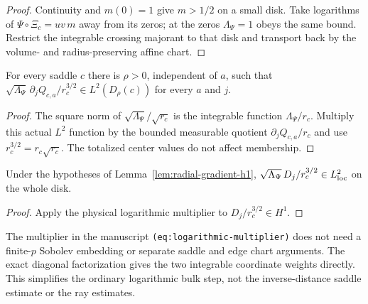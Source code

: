 \begin{proof}
\leanok
Continuity and $m(0)=1$ give $m>1/2$ on a small disk.
Take logarithms of $\Psi\circ\Xi_c=uv\,m$ away from its zeros; at the
zeros $\Lambda_\Psi=1$ obeys the same bound.
Restrict the integrable crossing majorant to that disk and transport
back by the volume- and radius-preserving affine chart.
\end{proof}

\begin{lemma}
\label{lem:saddle-quadratic-log-gradient}
\leanok
For every saddle $c$ there is $\rho>0$, independent of $a$, such that
$\sqrt{\Lambda_\Psi}\,\partial_jQ_{c,a}/r_c^{3/2}\in L^2(D_\rho(c))$
for every $a$ and $j$.
\end{lemma}

\begin{proof}
\leanok
The square norm of $\sqrt{\Lambda_\Psi}/\sqrt{r_c}$ is the integrable
function $\Lambda_\Psi/r_c$.
Multiply this actual $L^2$ function by the bounded measurable quotient
$\partial_jQ_{c,a}/r_c$ and use $r_c^{3/2}=r_c\sqrt{r_c}$.
The totalized center values do not affect membership.
\end{proof}

\begin{lemma}
\label{lem:log-radial-gradient}
\leanok
Under the hypotheses of Lemma~\ref{lem:radial-gradient-h1},
$\sqrt{\Lambda_\Psi}\,D_j/r_c^{3/2}\in L^2_{\rm loc}$ on the whole disk.
\end{lemma}

\begin{proof}
\leanok
Apply the physical logarithmic multiplier to $D_j/r_c^{3/2}\in H^1$.
\end{proof}

\begin{remark}
The multiplier in the manuscript \texttt{(eq:logarithmic-multiplier)}
does not need a finite-$p$ Sobolev embedding or separate saddle and edge
chart arguments. The exact diagonal factorization gives the two integrable
coordinate weights directly. This simplifies the ordinary logarithmic bulk
step, not the inverse-distance saddle estimate or the ray estimates.
\end{remark}

